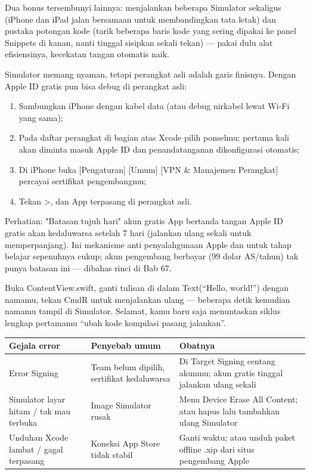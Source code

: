 Dua bonus tersembunyi lainnya: menjalankan beberapa Simulator sekaligus (iPhone dan iPad jalan bersamaan untuk membandingkan tata letak) dan pustaka potongan kode (tarik beberapa baris kode yang sering dipakai ke panel Snippets di kanan, nanti tinggal sisipkan sekali tekan) — pakai dulu alat efisiensinya, kecekatan tangan otomatis naik.


Simulator memang nyaman, tetapi perangkat asli adalah garis finisnya. Dengan Apple ID gratis pun bisa debug di perangkat asli:

\begin{enumerate}
  \item Sambungkan iPhone dengan kabel data (atau debug nirkabel lewat Wi-Fi yang sama);
  \item Pada daftar perangkat di bagian atas Xcode pilih ponselmu; pertama kali akan diminta masuk Apple ID dan penandatanganan dikonfigurasi otomatis;
  \item Di iPhone buka [Pengaturan] [Umum] [VPN \& Manajemen Perangkat] percayai sertifikat pengembangmu;
  \item Tekan >, dan App terpasang di perangkat asli.
\end{enumerate}

\begin{tcbwarn}{Perhatian: "Batasan tujuh hari" akun gratis}
App bertanda tangan Apple ID gratis akan kedaluwarsa setelah 7 hari (jalankan ulang sekali untuk memperpanjang). Ini mekanisme anti penyalahgunaan Apple dan untuk tahap belajar sepenuhnya cukup; akun pengembang berbayar (99 dolar AS/tahun) tak punya batasan ini — dibahas rinci di Bab 67.

\end{tcbwarn}



Buka ContentView.swift, ganti tulisan di dalam Text(“Hello, world!”) dengan namamu, tekan CmdR untuk menjalankan ulang — beberapa detik kemudian namamu tampil di Simulator. Selamat, kamu baru saja menuntaskan siklus lengkap pertamamu “ubah kode kompilasi pasang jalankan”.

\begin{center}
\begin{tabularx}{\linewidth}{|X|X|X|}
\hline
\textbf{Gejala error} & \textbf{Penyebab umum} & \textbf{Obatnya} \tabularnewline
\hline
Error Signing & Team belum dipilih, sertifikat kedaluwarsa & Di Target Signing centang akunmu; akun gratis tinggal jalankan ulang sekali \tabularnewline
Simulator layar hitam / tak mau terbuka & Image Simulator rusak & Menu Device Erase All Content; atau hapus lalu tambahkan ulang Simulator \tabularnewline
Unduhan Xcode lambat / gagal terpasang & Koneksi App Store tidak stabil & Ganti waktu; atau unduh paket offline .xip dari situs pengembang Apple \tabularnewline
\hline
\end{tabularx}
\end{center}

